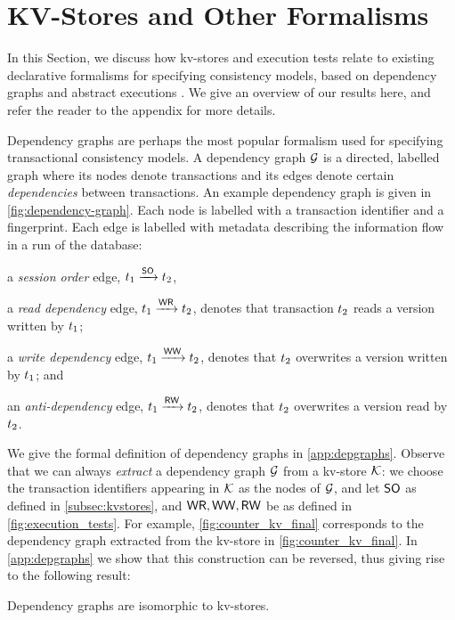 \section{KV-Stores and Other Formalisms}
\label{sec:other_formalisms}

In this Section, we discuss how kv-stores and execution 
tests relate to existing declarative formalisms for specifying  
consistency models, based on dependency graphs \cite{adya} 
and abstract executions \cite{framework-concur}. 
We give an overview of our results here, and refer the reader to the 
appendix for more details.


Dependency graphs \cite{adya-icde,adya} are perhaps the most popular 
formalism used for specifying transactional consistency models. 
A dependency graph $\mathcal{G}$ is a directed, labelled graph where its
nodes denote transactions and its edges denote certain \emph{dependencies} between transactions.  
An example dependency graph is given in \cref{fig:dependency-graph}.
Each node is labelled with a transaction identifier and a fingerprint.
Each edge is labelled with metadata describing the information flow in a run of the database: 
\begin{enumerate*}
    \item a \emph{session order} edge, $t_1 \xrightarrow{\mathsf{SO}} t_2$, 
	\item a \emph{read dependency} edge, $t_1 \xrightarrow{\mathsf{WR}} t_2$, denotes
that transaction $t_2$ reads a version written by $t_1$;
	\item a \emph{write dependency} edge, $t_1 \xrightarrow{\mathsf{WW}} t_2$, denotes that $t_2$ overwrites a version written by $t_1$; and 
	\item an \emph{anti-dependency} edge, $t_1 \xrightarrow{\mathsf{RW}} t_2$, denotes that $t_2$ overwrites a version read by $t_2$. 
\end{enumerate*}
We give the formal definition of dependency graphs in \cref{app:depgraphs}.
Observe that we can always \emph{extract} a dependency graph  $\mathcal{G}$ from a kv-store $\mathcal{K}$:
we choose the transaction identifiers appearing in $\mathcal{K}$ as the nodes of $\mathcal{G}$, 
and let $\mathsf{SO}$ as defined in \cref{subsec:kvstores}, and $ \mathsf{WR}, \mathsf{WW}, \mathsf{RW}$  
be as defined in \cref{fig:execution_tests}.
For example, \cref{fig:counter_kv_final} corresponds to the dependency graph extracted from the kv-store in \cref{fig:counter_kv_final}.
In \cref{app:depgraphs} we show that this construction can be reversed, thus giving 
rise to the following result: 
\begin{theorem}
\label{thm:kv_graph_isomorph}
Dependency graphs are isomorphic to kv-stores.
\end{theorem}

